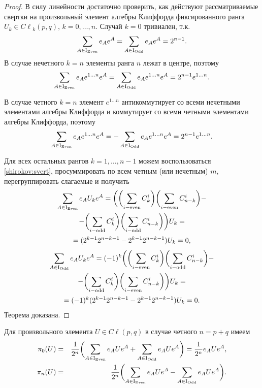 \begin{proof} В силу линейности достаточно проверить, как действуют рассматриваемые свертки на произвольный элемент алгебры Клиффорда фиксированного ранга
$U_k\in{{C}\!\ell}_k(p,q)$, $k=0, \ldots, n$.
Случай $k=0$ тривиален, т.к. 
$$\sum_{A\in{\rm I}_ {\mathop{\rm Even}}}e_A e^A=\sum_{A\in{\rm I}_ {\mathop{\rm Odd}}}e_A e^A=2^{n-1}.$$ 
В случае нечетного $k=n$ элементы ранга $n$ лежат в центре, поэтому $$\sum_{A\in{\rm I}_ {\mathop{\rm Even}}}e_A e^{1\ldots n}e^A=\sum_{A\in{\rm I}_ {\mathop{\rm Odd}}}e_A e^{1\ldots n}e^A=2^{n-1}e^{1\ldots n}.$$ 

\pagebreak

\noindent
В случае четного $k=n$ элемент $e^{1\ldots n}$ антикоммутирует со всеми нечетными элементами алгебры Клиффорда и коммутирует со всеми четными элементами алгебры Клиффорда, поэтому
$$\sum_{A\in{\rm I}_ {\mathop{\rm Even}}}e_A e^{1\ldots n}e^A=-\sum_{A\in{\rm I}_ {\mathop{\rm Odd}}}e_A e^{1\ldots n}e^A=2^{n-1}e^{1\ldots n}.$$



Для всех остальных рангов $k=1,\ldots, n-1$ можем воспользоваться \eqref{shirokov:svert}, просуммировать по всем четным (или нечетным) $m$, перегруппировать слагаемые и получить
\begin{multline}
\sum_{A\in{\rm I}_ {\mathop{\rm Even}}}e_A U_k e^A=
\biggl(
\biggl(\sum_{i - \text{even}}C_k^i\biggr)\biggl(\sum_{i - \text{even}}C_{n-k}^i\biggr)- \\ -
\biggl(\sum_{i - \text{odd}}C_k^i\biggr)\biggl(\sum_{i - \text{odd}}C_{n-k}^i\biggr)\biggr)U_k=\\
=(2^{k-1} 2^{n-k-1}-2^{k-1} 2^{n-k-1})U_k=0,
\end{multline}
\begin{multline}
\sum_{A\in{\rm I}_ {\mathop{\rm Odd}}}e_A U_k e^A=(-1)^k
\biggl(\biggl(\sum_{i - \text{even}}C_k^i\biggr)\biggl(\sum_{i - \text{odd}}C_{n-k}^i\biggr)- \\ - \biggl(\sum_{i - \text{odd}}C_k^i\biggr)\biggl(\sum_{i - \text{even}}C_{n-k}^i\biggr)\biggr)U_k=
\\=(-1)^k (2^{k-1} 2^{n-k-1}-2^{k-1} 2^{n-k-1})U_k=0.
\end{multline}
Теорема доказана.
\end{proof}

\smallskip

\begin{theorem}[5]Для произвольного элемента $U\in{{C}\!\ell}(p,q)$ в случае четного $n=p+q$ имеем
\begin{eqnarray*}
\pi_0(U)&=&\frac{1}{2^n}\biggl(\sum_{A\in{\rm I}_ {\mathop{\rm Even}}}e_A U e^A+\sum_{A\in{\rm I}_ {\mathop{\rm Odd}}}e_A U e^A\biggr)=\frac{1}{2^n}e_A U e^A,\\
\pi_n(U)&=&\frac{1}{2^n}\biggl(\sum_{A\in{\rm I}_ {\mathop{\rm Even}}}e_A U e^A-\sum_{A\in{\rm I}_ {\mathop{\rm Odd}}}e_A U e^A\biggr).
\end{eqnarray*}
\end{theorem}


